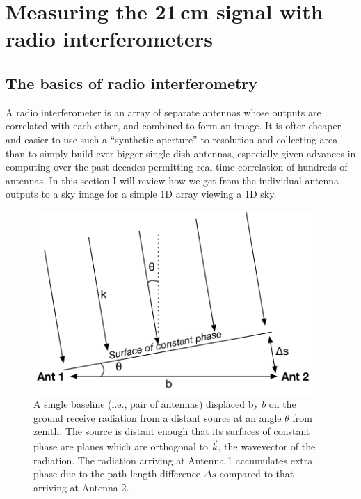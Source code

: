 \section{Measuring the 21\,cm signal with radio interferometers}

\subsection{The basics of radio interferometry}

A radio interferometer is an array of separate antennas whose outputs are correlated with each other, and combined to form an image. It is ofter cheaper and easier to use such a ``synthetic aperture'' to resolution and collecting area than to simply build ever bigger single dish antennas, especially given advances in computing over the past decades permitting real time correlation of hundreds of antennas. In this section I will review how we get from the individual antenna outputs to a sky image for a simple 1D array viewing a 1D sky.

\begin{figure}[h]
    \centering
    \includegraphics[width=0.95\textwidth]{chap0_intro/radio_interferometer_diagram.pdf}
    \caption[Diagram of a two element radio interferometer]{A single baseline (i.e., pair of antennas) displaced by $b$ on the ground receive radiation from a distant source at an angle $\theta$ from zenith. The source is distant enough that its surfaces of constant phase are planes which are orthogonal to $\vec{k}$, the wavevector of the radiation. The radiation arriving at Antenna 1 accumulates extra phase due to the path length difference $\Delta s$ compared to that arriving at Antenna 2.}
    \label{fig:radiointerferometerdiagram}
\end{figure}

